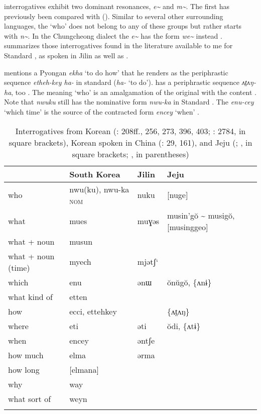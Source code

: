  interrogatives exhibit two dominant resonances, \textit{e{\textasciitilde}} and \textit{m{\textasciitilde}}. The first has previously been compared with  (). Similar to several other surrounding languages, the  ‘who’ does not belong to any of these groups but rather starts with \textit{n{\textasciitilde}}. In the Chungcheong dialect the  \textit{e{\textasciitilde}} has the form \textit{we{\textasciitilde}} instead \citep[267]{King2006b}.  summarizes those interrogatives found in the literature available to me for Standard ,  as spoken in Jilin as well as .

\citet[69]{Sohn1999} mentions a Pyongan  \textit{ekha} ‘to do how’ that he renders as the periphrastic sequence \textit{etheh-key ha-} in standard  (\textit{ha-} ‘to do’).  has a periphrastic sequence \textit{ʌt̤}\textit{ʌŋ-ha}, too \citep[65]{Saltzman2014}. The  meaning ‘who’ is an amalgamation of the original  with the content  \citep[456]{Sohn2015}. Note that \textit{nwuku} still has the nominative form \textit{nwu-ka} in Standard . The  \textit{enu-cey} ‘which time’ is the source of the contracted form \textit{encey} ‘when’ \citep[262]{Sohn1999}.

\begin{table}
\caption{Interrogatives from Korean (\citealt{Sohn1999}: 208ff., 256, 273, 396, 403; \citealt{Yoon2010}: 2784, in square brackets), Korean spoken in China (\citealt{XuanDewu1985}: 29, 161), and Jeju (\citealt{Kiaer2014}; \citealt{ChengHarrison2014}, in square brackets; \citealt{Saltzman2014}, in parentheses)}
\label{tab:kore:8}

\begin{tabularx}{\textwidth}{Xlll}
\lsptoprule
& \textbf{South Korea} & \textbf{Jilin} & \textbf{Jeju}\\
\midrule
who & nwu(ku), nwu-ka \textsc{nom} & nuku & [nuge]\\
what & mues & muɣəs & musin’gŏ {\textasciitilde} musigŏ, [musinggeo]\\
what + noun & musun &  & \\
what + noun (time) & myech & mjətʃ‘ & \\
which & enu & ənɯ & ŏnŭgŏ, \{ʌnɨ\}\\
what kind of & etten &  & \\
how & ecci, ettehkey &  & \{ʌ{t̤}ʌŋ\}\\
where & eti & əti & ŏdi, \{ʌtɨ\}\\
when & encey & əntʃe & \\
how much & elma & ərma & \\
how long & [elmana] &  & \\
why & way &  & \\
what sort of & weyn &  & \\
\lspbottomrule
\end{tabularx}
\end{table}

